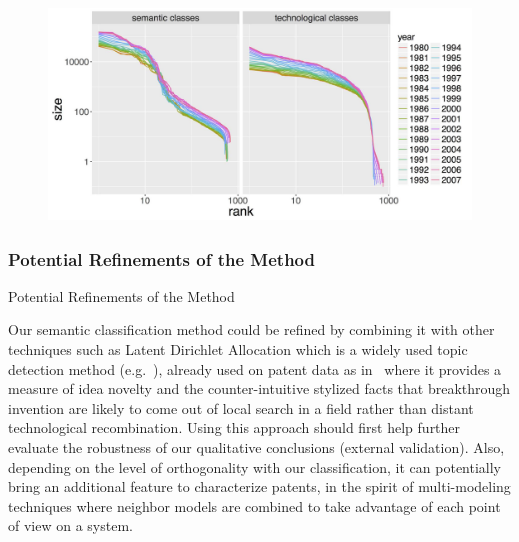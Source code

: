 \begin{figure}
\includegraphics[width=\linewidth]{Figures/Final/C-patentsmining-class-sizes}
\label{fig:patentsmining:class-sizes}
\end{figure}



\subsubsection*{Potential Refinements of the Method}{Potential Refinements of the Method}

Our semantic classification method could be refined by combining it with other techniques such as Latent Dirichlet Allocation which is a widely used topic detection method (e.g.~\cite{blei2003latent}), already used on patent data as in~\cite{kaplan2015double} where it provides a measure of idea novelty and the counter-intuitive stylized facts that breakthrough invention are likely to come out of local search in a field rather than distant technological recombination. Using this approach should first help further evaluate the robustness of our qualitative conclusions (external validation). Also, depending on the level of orthogonality with our classification, it can potentially bring an additional feature to characterize patents, in the spirit of multi-modeling techniques where neighbor models are combined to take advantage of each point of view on a system.

